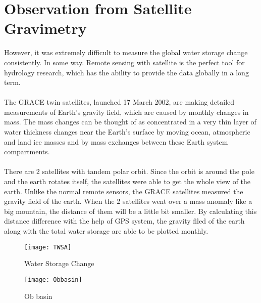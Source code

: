 \section{Observation from Satellite Gravimetry}
However, it was extremely difficult to measure the global water storage change consistently. In some way. Remote sensing with satellite is the perfect tool for hydrology research, which has the ability to provide the data globally in a long term.\\\\
The GRACE twin satellites, launched 17 March 2002, are making detailed measurements of Earth's gravity field, which are caused by monthly changes in mass. The mass changes can be thought of as concentrated in a very thin layer of water thickness changes near the Earth's surface by moving ocean, atmospheric and land ice masses and by mass exchanges between these Earth system compartments. \\\\
There are 2 satellites with tandem polar orbit. Since the orbit is around the pole and the earth rotates itself, the satellites were able to get the whole view of the earth. Unlike the normal remote sensors, the GRACE satellites measured the gravity field of the earth. When the 2 satellites went over a mass anomaly like a big mountain, the distance of them will be a little bit smaller. By calculating this distance difference with the help of GPS system, the gravity filed of the earth along with the total water storage are able to be plotted monthly. 
\begin{figure}[htbp]
	\centering
	\texttt{[image: TWSA]} %
	\caption{Water Storage Change} 
	\label{fig:TWSA}
\end{figure}
\begin{figure}[ht]
	\centering
	\texttt{[image: Obbasin]} %
	\caption{Ob basin} 
	\label{fig:Obbasin}
\end{figure}\\
